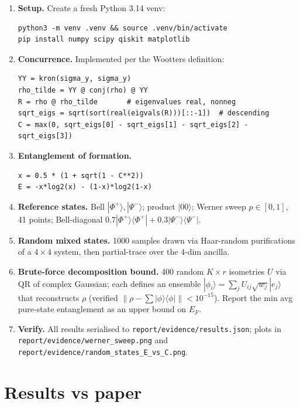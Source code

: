 \documentclass[11pt]{article}
\begin{document}
\begin{enumerate}
\item \textbf{Setup.} Create a fresh Python 3.14 venv:
\begin{lstlisting}
python3 -m venv .venv && source .venv/bin/activate
pip install numpy scipy qiskit matplotlib
\end{lstlisting}
\item \textbf{Concurrence.} Implemented per the Wootters definition:
\begin{lstlisting}
YY = kron(sigma_y, sigma_y)
rho_tilde = YY @ conj(rho) @ YY
R = rho @ rho_tilde       # eigenvalues real, nonneg
sqrt_eigs = sqrt(sort(real(eigvals(R)))[::-1])  # descending
C = max(0, sqrt_eigs[0] - sqrt_eigs[1] - sqrt_eigs[2] - sqrt_eigs[3])
\end{lstlisting}
\item \textbf{Entanglement of formation.}
\begin{lstlisting}
x = 0.5 * (1 + sqrt(1 - C**2))
E = -x*log2(x) - (1-x)*log2(1-x)
\end{lstlisting}
\item \textbf{Reference states.} Bell $|\Phi^+\rangle,|\Psi^-\rangle$; product
$|00\rangle$; Werner sweep $p\in[0,1]$, 41 points; Bell-diagonal
$0.7|\Phi^+\rangle\!\langle\Phi^+| + 0.3|\Psi^-\rangle\!\langle\Psi^-|$.
\item \textbf{Random mixed states.} 1000 samples drawn via Haar-random
purifications of a $4\!\times\!4$ system, then partial-trace over the
$4$-dim ancilla.
\item \textbf{Brute-force decomposition bound.} 400 random $K\!\times\!r$
isometries $U$ via QR of complex Gaussian; each defines an ensemble
$|\phi_i\rangle = \sum_j U_{ij}\sqrt{w_j}|e_j\rangle$ that reconstructs
$\rho$ (verified $\|\rho - \sum|\phi\rangle\!\langle\phi|\| < 10^{-15}$).
Report the min avg pure-state entanglement as an upper bound on $E_F$.
\item \textbf{Verify.} All results serialised to
\texttt{report/evidence/results.json}; plots in
\texttt{report/evidence/werner\_sweep.png} and
\texttt{report/evidence/random\_states\_E\_vs\_C.png}.
\end{enumerate}

\section{Results vs paper}
\end{document}
